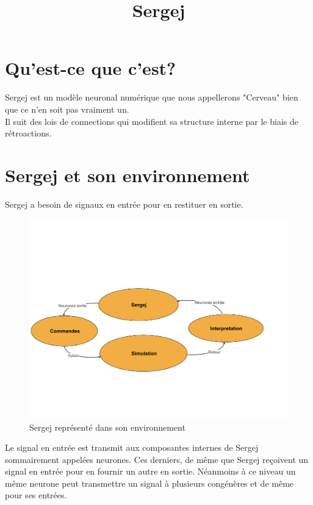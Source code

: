 \documentclass[a4paper,10pt]{article}
\title{Sergej}
\theoremstyle{definition}
\theoremstyle{remark}
\theoremstyle{plain}
\begin{document}
\maketitle

\tableofcontents

\newpage

\section{Qu'est-ce que c'est?}

Sergej est un modèle neuronal numérique que nous appellerons "Cerveau" bien que ce n'en soit pas vraiment un.\\
Il suit des lois de connections qui modifient sa structure interne par le biais de rétroactions.

\section{Sergej et son environnement}

Sergej a besoin de signaux en entrée pour en restituer en sortie.
\begin{figure}
\centering
\includegraphics[scale=0.5]{System_commande_diagrame}
\caption{Sergej représenté dans son environnement}
\end{figure}

Le signal en entrée est transmit aux composantes internes de Sergej sommairement appelées neurones. Ces derniers, de même que Sergej reçoivent un signal en entrée pour en fournir un autre en sortie. Néanmoins à ce niveau un même neurone peut transmettre un signal à plusieurs congénères et de même pour ses entrées.
\end{document}
